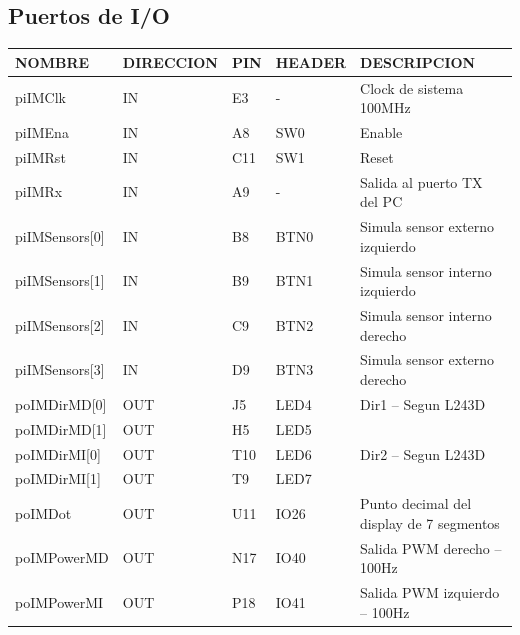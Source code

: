 \documentclass[12pt]{article}
\begin{document}
\subsection{Puertos de I/O}

{
\begin{tabular}{|p{2.5cm}|p{2.5cm}|p{1.3cm}|p{1.8cm}|p{7.5cm}|}
\hline			
\textbf{NOMBRE} & \textbf{DIRECCION} & \textbf{PIN}	& \textbf{HEADER} & \textbf{DESCRIPCION} \\
\hline
piIMClk &
IN &
E3 &
- &
Clock de sistema 100MHz
\\

piIMEna &
IN &
A8 &
SW0 &
Enable
\\

piIMRst &
IN &
C11 &
SW1 &
Reset
\\

piIMRx &
IN &
A9 &
- &
Salida al puerto TX del PC
\\

piIMSensors[0] &
IN &
B8 &
BTN0 &
Simula sensor externo izquierdo
\\

piIMSensors[1] &
IN &
B9 &
BTN1 &
Simula sensor interno izquierdo
\\

piIMSensors[2] &
IN &
C9 &
BTN2 &
Simula sensor interno derecho
\\

piIMSensors[3] &
IN &
D9 &
BTN3 &
Simula sensor externo derecho
\\

poIMDirMD[0] &
OUT &
J5 &
LED4 &
Dir1 – Segun L243D
\\

poIMDirMD[1] &
OUT &
H5 &
LED5 &

\\

poIMDirMI[0] &
OUT &
T10 &
LED6 &
Dir2 – Segun L243D
\\

poIMDirMI[1] &
OUT &
T9 &
LED7 &

\\

poIMDot &
OUT &
U11 &
IO26 &
Punto decimal del display de 7 segmentos
\\

poIMPowerMD &
OUT &
N17 &
IO40 &
Salida PWM derecho – 100Hz
\\

poIMPowerMI &
OUT &
P18 &
IO41 &
Salida PWM izquierdo – 100Hz
\\


\end{tabular}}
\end{document}
